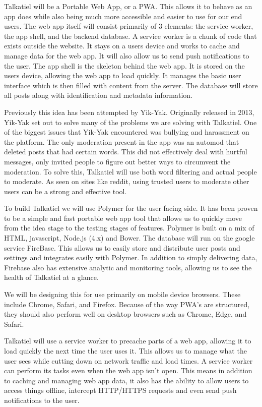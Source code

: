 \documentclass[12pt]{article}
\begin{document}
	Talkatiel will be a Portable Web App, or a PWA.  This allows it to behave as an app does while also being much more accessible and easier to use for our end users.  The web app itself will consist primarily of 3 elements:   the service worker, the app shell, and the backend database.  A service worker is a chunk of code that exists outside the website.  It stays on a users device and works to cache and manage data for the web app.  It will also allow us to send push notifications to the user.  The app shell is the skeleton behind the web app.  It is stored on the users device, allowing the web app to load quickly.  It manages the basic user interface which is then filled with content from the server.  The database will store all posts along with identification and metadata information.

	Previously this idea has been attempted by Yik-Yak.  Originally released in 2013, Yik-Yak set out to solve many of the problems we are solving with Talkatiel.  One of the biggest issues that Yik-Yak encountered was bullying and harassment on the platform\cite{item1}.  The only moderation present in the app was an automod that deleted posts that had certain words.  This did not effectively deal with hurtful messages, only invited people to figure out better ways to circumvent the moderation.  To solve this, Talkatiel will use both word filtering and actual people to moderate.  As seen on sites like reddit, using trusted users to moderate other users can be a strong and effective tool.

	To build Talkatiel we will use Polymer for the user facing side.  It has been proven to be a simple and fast portable web app tool that allows us to quickly move from the idea stage to the testing stages of features.  Polymer is built on a mix of HTML, javascript, Node.js (4.x) and Bower.  The database will run on the google service FireBase.  This allows us to easily store and distribute user posts and settings and integrates easily with Polymer.  In addition to simply delivering data, Firebase also has extensive analytic and monitoring tools, allowing us to see the health of Talkatiel at a glance.

	We will be designing this for use primarily on mobile device browsers.  These include Chrome, Safari, and Firefox.  Because of the way PWA’s are structured, they should also perform well on desktop browsers such as Chrome, Edge, and Safari.

  Talkatiel will use a service worker to precache parts of a web app, allowing it to load quickly the next time the user uses it.  This allows us to manage what the user sees while cutting down on network traffic and load times.  A service worker can perform its tasks even when the web app isn’t open.  This means in addition to caching and managing web app data, it also has the ability to allow users to access things offline, intercept HTTP/HTTPS requests and even send push notifications to the user.
\end{document}
